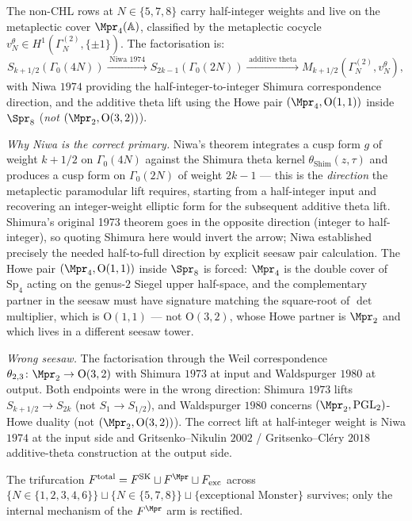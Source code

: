 \begin{theorem}
\label{wn:thm:second-pass-boundary-extension}

The non-CHL rows at $N \in \{5, 7, 8\}$ carry half-integer weights and
live on the metaplectic cover $\Mpr_4(\mathbb{A})$, classified by the
metaplectic cocycle $v^{\theta}_N \in H^1(\Gamma^{(2)}_N, \{\pm 1\})$.
The factorisation is:
\[
S_{k + 1/2}(\Gamma_0(4N)) \xrightarrow{\;\text{Niwa }1974\;}
S_{2k-1}(\Gamma_0(2N)) \xrightarrow{\;\text{additive theta}\;}
M_{k + 1/2}(\Gamma^{(2)}_N, v^{\theta}_N),
\]
with Niwa $1974$ providing the half-integer-to-integer Shimura
correspondence direction, and the additive theta lift using the Howe
pair $(\Mpr_4, \mathrm{O}(1, 1))$ inside $\Spr_8$ (\emph{not}
$(\Mpr_2, \mathrm{O}(3, 2))$).

\emph{Why Niwa is the correct primary.} Niwa's theorem integrates a
cusp form $g$ of weight $k + 1/2$ on $\Gamma_0(4N)$ against the
Shimura theta kernel $\theta_{\mathrm{Shim}}(z, \tau)$ and produces
a cusp form on $\Gamma_0(2N)$ of weight $2k - 1$ --- this is the
\emph{direction} the metaplectic paramodular lift requires, starting
from a half-integer input and recovering an integer-weight elliptic
form for the subsequent additive theta lift. Shimura's original 1973
theorem goes in the opposite direction (integer to half-integer), so
quoting Shimura here would invert the arrow; Niwa established
precisely the needed half-to-full direction by explicit seesaw pair
calculation. The Howe pair $(\Mpr_4, \mathrm{O}(1, 1))$ inside
$\Spr_8$ is forced: $\Mpr_4$ is the double cover of $\mathrm{Sp}_4$
acting on the genus-$2$ Siegel upper half-space, and the complementary
partner in the seesaw must have signature matching the square-root
of $\det$ multiplier, which is $\mathrm{O}(1, 1)$ --- not
$\mathrm{O}(3, 2)$, whose Howe partner is $\Mpr_2$ and which lives
in a different seesaw tower.

\emph{Wrong seesaw.} The factorisation through the Weil correspondence
$\theta_{2, 3}\colon \Mpr_2 \to \mathrm{O}(3, 2)$ with Shimura $1973$
at input and Waldspurger $1980$ at output. Both endpoints were in the
wrong direction: Shimura $1973$ lifts $S_{k+1/2} \to S_{2k}$ (not
$S_1 \to S_{1/2}$), and Waldspurger $1980$ concerns
$(\Mpr_2, \mathrm{PGL}_2)$-Howe duality (not
$(\Mpr_2, \mathrm{O}(3, 2))$). The correct lift at half-integer
weight is Niwa $1974$ at the input side and
Gritsenko--Nikulin $2002$ / Gritsenko--Cl\'ery $2018$ additive-theta
construction at the output side.

The trifurcation $F^{\mathrm{total}} = F^{\mathrm{SK}} \sqcup
F^{\Mpr} \sqcup F_{\mathrm{exc}}$ across
$\{N \in \{1,2,3,4,6\}\} \sqcup \{N \in \{5,7,8\}\} \sqcup
\{\text{exceptional Monster}\}$ survives; only the internal mechanism
of the $F^{\Mpr}$ arm is rectified.
\end{theorem}

